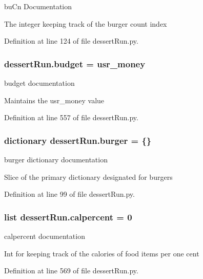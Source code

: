 bu\-Cn Documentation 

The integer keeping track of the burger count index 

Definition at line 124 of file dessert\-Run.\-py.

\hypertarget{namespacedessertRun_ad382a954043a8ddd9981e8826734fc25}{
\subsubsection[{budget}]{\setlength{\rightskip}{0pt plus 5cm}dessert\-Run.\-budget = {\bf usr\-\_\-money}}}\label{namespacedessertRun_ad382a954043a8ddd9981e8826734fc25}


budget documentation 

Maintains the usr\-\_\-money value 

Definition at line 557 of file dessert\-Run.\-py.

\hypertarget{namespacedessertRun_ac805a15da74f0b8905a97892c48125d0}{
\subsubsection[{burger}]{\setlength{\rightskip}{0pt plus 5cm}dictionary dessert\-Run.\-burger = \{\}}}\label{namespacedessertRun_ac805a15da74f0b8905a97892c48125d0}


burger dictionary documentation 

Slice of the primary dictionary designated for burgers 

Definition at line 99 of file dessert\-Run.\-py.

\hypertarget{namespacedessertRun_a7af5e5c1df399dbe2d73cb7e89c3a1a3}{
\subsubsection[{calpercent}]{\setlength{\rightskip}{0pt plus 5cm}list dessert\-Run.\-calpercent = 0}}\label{namespacedessertRun_a7af5e5c1df399dbe2d73cb7e89c3a1a3}


calpercent documentation 

Int for keeping track of the calories of food items per one cent 

Definition at line 569 of file dessert\-Run.\-py.

